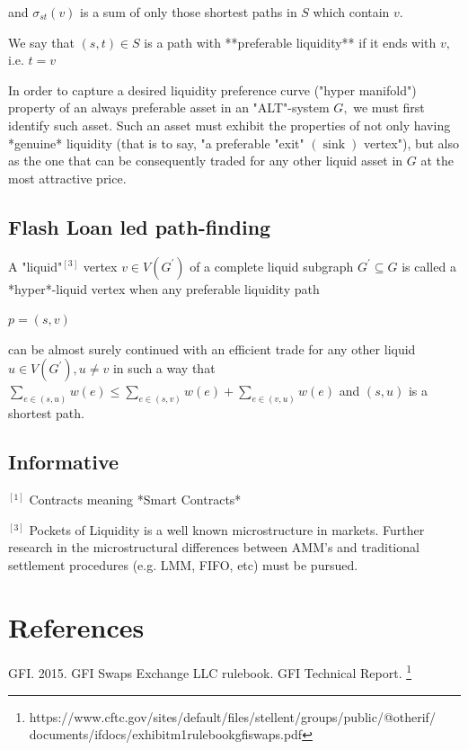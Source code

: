 {{{and $\sigma_{s t}(v)$ is a sum of only those shortest paths in $S$ which contain $v .$

We say that $(s, t) \in S$ is a path with **preferable liquidity** if it ends with $v,$ i.e. $t=v$


In order to capture a desired liquidity preference curve ("hyper manifold") property of an always preferable asset in an 
"ALT"-system $G,$ we must first identify such asset. Such an asset must exhibit the properties of not only having *genuine* liquidity (that is to say, "a preferable "exit" $(\operatorname{sink})$ vertex"), but also as the one that can be consequently traded for any other liquid asset in $G$ at the most attractive price.

\subsection{Flash Loan led path-finding}

A "liquid"$^[3]$ vertex $v \in V\left(G^{\prime}\right)$ of a complete liquid subgraph $G^{\prime} \subseteq G$ is called a *hyper*-liquid vertex when any preferable liquidity path 

$p=(s, v)$ 

can be almost surely continued with an efficient trade for any other liquid $u \in V\left(G^{\prime}\right), u \neq v$ in such a way that $\sum_{e \in(s, u)} w(e) \leq \sum_{e \in(s, v)} w(e)+\sum_{e \in(v, u)} w(e)$ and $(s, u)$ is
a shortest path.


\subsection{Informative}

$^[1]$ Contracts meaning *Smart Contracts*

$^[3]$ Pockets of Liquidity is a well known microstructure in markets. Further research in the microstructural differences between AMM's and traditional settlement procedures (e.g. LMM, FIFO, etc) must be pursued.



\newpage

\section{References}

GFI. 2015. GFI Swaps Exchange LLC rulebook. GFI Technical Report.
\footnote{https://www.cftc.gov/sites/default/files/stellent/groups/public/@otherif/
documents/ifdocs/exhibitm1rulebookgfiswaps.pdf}


}}}
